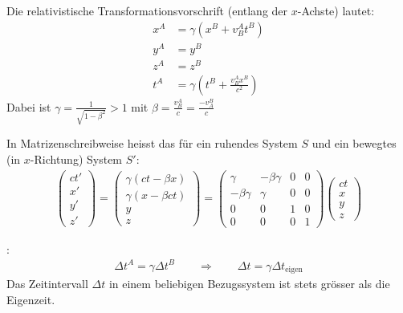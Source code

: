 
Die relativistische Transformationsvorschrift (entlang der $x$-Achste) lautet:
\begin{align*}
    x^A &= \gamma (x^B + v_B^{A} t^B) \\
    y^{A} &= y^B \\
    z^{A} &= z^B \\
    t^{A} &= \gamma (t^B + \frac{v_B^{A} x^B}{c^2})
\end{align*}
Dabei ist $\gamma = \frac{1}{\sqrt{1- \beta^2}} > 1$ mit $\beta = \frac{v_B^{A}}{c}  =
\frac{-v_A^B}{c}$

In Matrizenschreibweise heisst das für ein ruhendes System $S$ und ein bewegtes
(in $x$-Richtung) System $S'$:
\begin{align*}
    \begin{pmatrix}
        ct' \\ x' \\ y' \\ z'
    \end{pmatrix} = \begin{pmatrix}
        \gamma (ct - \beta x) \\ \gamma (x- \beta c t) \\ y \\ z
    \end{pmatrix} = \begin{pmatrix}
        \gamma & - \beta \gamma & 0 & 0 \\
        - \beta \gamma & \gamma & 0 & 0 \\
        0 & 0 & 1 & 0 \\
        0 & 0 & 0 & 1
    \end{pmatrix} \begin{pmatrix}
        ct \\ x \\ y \\ z
    \end{pmatrix}
\end{align*}

\vspace{1\baselineskip}

:
\begin{align*}
    \Delta t^A = \gamma \Delta t^B
    \quad \quad \Longrightarrow \quad \quad
    \Delta t = \gamma \Delta t_{\text{eigen}}
\end{align*}
Das Zeitintervall $\Delta t$ in einem beliebigen Bezugssystem ist stets grösser als die
Eigenzeit.

